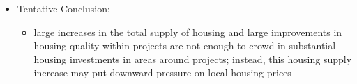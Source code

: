 \documentclass[12pt]{article}
\begin{document}
\begin{itemize}
\item Tentative Conclusion:
\begin{itemize}
    \item large increases in the total supply of housing and large improvements in housing quality within projects are not enough to crowd in substantial housing investments in areas around projects; instead, this housing supply increase may put downward pressure on local housing prices
\end{itemize}

\end{itemize}
\end{document}
